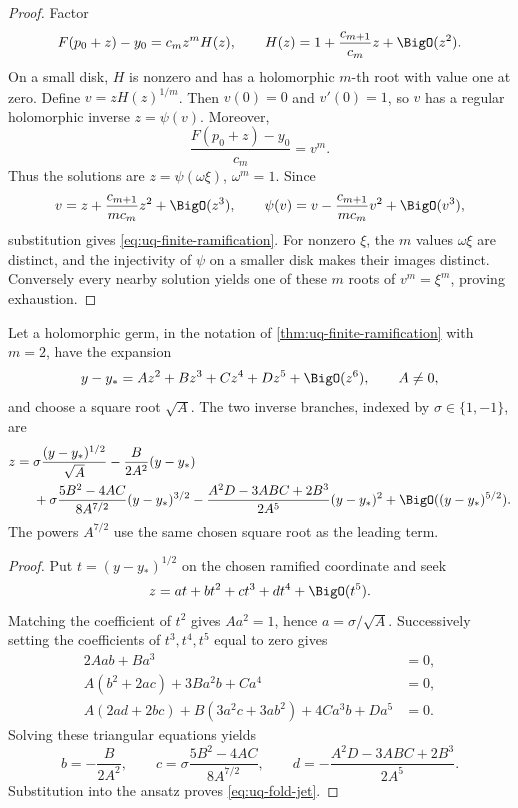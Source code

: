 \begin{proof}
Factor
\[
 F(p_0+z)-y_0=c_mz^mH(z),
 \qquad
 H(z)=1+\frac{c_{m+1}}{c_m}z+\BigO(z^2).
\]
On a small disk, \(H\) is nonzero and has a holomorphic \(m\)-th root with
value one at zero.  Define \(v=zH(z)^{1/m}\).  Then \(v(0)=0\) and
\(v'(0)=1\), so \(v\) has a regular holomorphic inverse \(z=\psi(v)\).
Moreover,
\[
 \frac{F(p_0+z)-y_0}{c_m}=v^m.
\]
Thus the solutions are \(z=\psi(\omega\xi)\), \(\omega^m=1\).  Since
\[
 v=z+\frac{c_{m+1}}{mc_m}z^2+\BigO(z^3),
 \qquad
 \psi(v)=v-\frac{c_{m+1}}{mc_m}v^2+\BigO(v^3),
\]
substitution gives \eqref{eq:uq-finite-ramification}.  For nonzero
\(\xi\), the \(m\) values \(\omega\xi\) are distinct, and the injectivity of
\(\psi\) on a smaller disk makes their images distinct.  Conversely every
nearby solution yields one of these \(m\) roots of \(v^m=\xi^m\), proving
exhaustion.
\end{proof}

\begin{corollary}
\label{cor:uq-fold-jet}
Let a holomorphic germ, in the notation of
\cref{thm:uq-finite-ramification} with \(m=2\), have the expansion
\[
 y-y_*=Az^2+Bz^3+Cz^4+Dz^5+\BigO(z^6),
 \qquad A\ne0,
\]
and choose a square root \(\sqrt A\).  The two inverse branches, indexed by
\(\sigma\in\{1,-1\}\), are
\begin{align}
 z={}&\sigma\frac{(y-y_*)^{1/2}}{\sqrt A}
 -\frac{B}{2A^2}(y-y_*)\notag\\
 &+\sigma\frac{5B^2-4AC}{8A^{7/2}}(y-y_*)^{3/2}
 -\frac{A^2D-3ABC+2B^3}{2A^5}(y-y_*)^2
 +\BigO((y-y_*)^{5/2}).
\label{eq:uq-fold-jet}
\end{align}
The powers \(A^{7/2}\) use the same chosen square root as the leading term.
\end{corollary}

\begin{proof}
Put \(t=(y-y_*)^{1/2}\) on the chosen ramified coordinate and seek
\[
 z=at+bt^2+ct^3+dt^4+\BigO(t^5).
\]
Matching the coefficient of \(t^2\) gives \(Aa^2=1\), hence
\(a=\sigma/\sqrt A\).  Successively setting the coefficients of
\(t^3,t^4,t^5\) equal to zero gives
\[
\begin{aligned}
 2Aab+Ba^3&=0,\\
 A(b^2+2ac)+3Ba^2b+Ca^4&=0,\\
 A(2ad+2bc)+B(3a^2c+3ab^2)+4Ca^3b+Da^5&=0.
\end{aligned}
\]
Solving these triangular equations yields
\[
 b=-\frac{B}{2A^2},\qquad
 c=\sigma\frac{5B^2-4AC}{8A^{7/2}},\qquad
 d=-\frac{A^2D-3ABC+2B^3}{2A^5}.
\]
Substitution into the ansatz proves \eqref{eq:uq-fold-jet}.
\end{proof}

